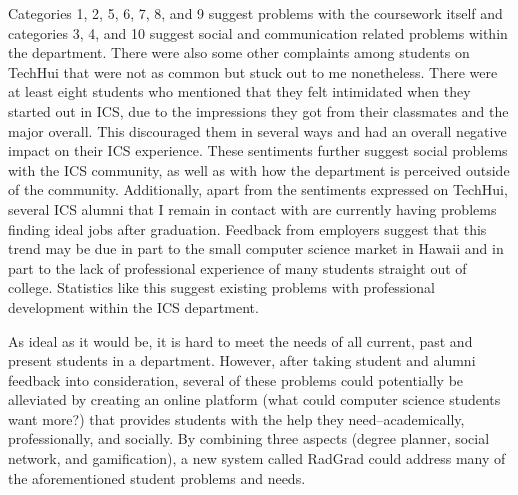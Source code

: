 Categories 1, 2, 5, 6, 7, 8, and 9 suggest problems with the coursework itself and categories 3, 4, and 10 suggest social and communication related problems within the department. There were also some other complaints among students on TechHui that were not as common but stuck out to me nonetheless. There were at least eight students who mentioned that they felt intimidated when they started out in ICS, due to the impressions they got from their classmates and the major overall. This discouraged them in several ways and had an overall negative impact on their ICS experience. These sentiments further suggest social problems with the ICS community, as well as with how the department is perceived outside of the community. Additionally, apart from the sentiments expressed on TechHui, several ICS alumni that I remain in contact with are currently having problems finding ideal jobs after graduation. Feedback from employers suggest that this trend may be due in part to the small computer science market in Hawaii and in part to the lack of professional experience of many students straight out of college. Statistics like this suggest existing problems with professional development within the ICS department. 

As ideal as it would be, it is hard to meet the needs of all current, past and present students in a department. However, after taking student and alumni feedback into consideration, several of these problems could potentially be alleviated by creating an online platform (what could computer science students want more?) that provides students with the help they need--academically, professionally, and socially. By combining three aspects (degree planner, social network, and gamification), a new system called RadGrad could address many of the aforementioned student problems and needs.  

